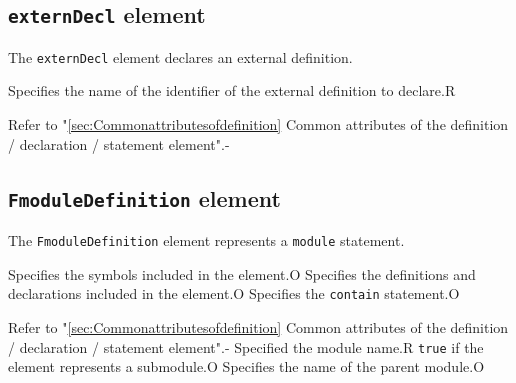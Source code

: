 \subsection{ {\tt externDecl} element}

The {\tt externDecl} element declares an external definition.


\begin{XcodeMLChildElements}
{Specifies the name of the identifier of the external definition to declare.}{R}
\end{XcodeMLChildElements}

\begin{XcodeMLAttributes}
{Refer to "\ref{sec:Commonattributesofdefinition} Common attributes of the definition / declaration / statement element".}{-}
\end{XcodeMLAttributes}


\subsection{ {\tt FmoduleDefinition} element}

The {\tt FmoduleDefinition} element represents a {\tt module} statement.


\begin{XcodeMLChildElements}
{Specifies the symbols included in the element.}{O}
{Specifies the definitions and declarations included in the element.}{O}
{Specifies the {\tt contain} statement.}{O}
\end{XcodeMLChildElements}

\begin{XcodeMLAttributes}
{Refer to "\ref{sec:Commonattributesofdefinition} Common attributes of the definition / declaration / statement element".}{-}
{Specified the module name.}{R}
{{\tt true} if the element represents a submodule.}{O}
{Specifies the name of the parent module.}{O}
\end{XcodeMLAttributes}


